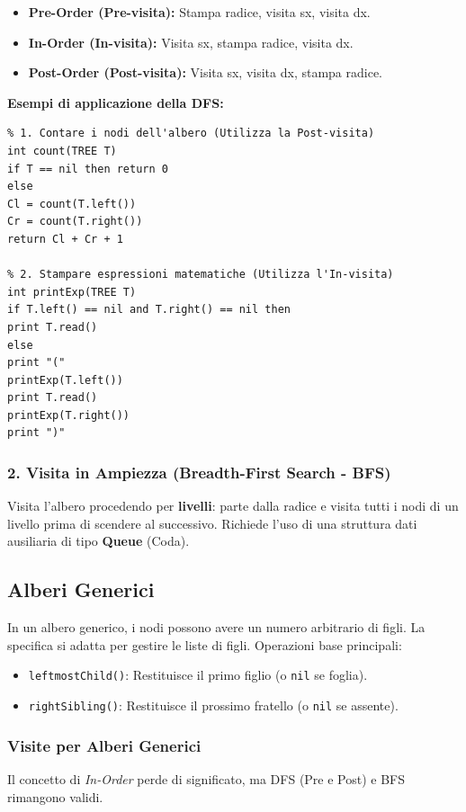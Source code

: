 \documentclass[12pt, a4paper]{article}
\begin{document}
\begin{itemize}
\item \textbf{Pre-Order (Pre-visita):} Stampa radice, visita sx, visita dx.
\item \textbf{In-Order (In-visita):} Visita sx, stampa radice, visita dx.
\item \textbf{Post-Order (Post-visita):} Visita sx, visita dx, stampa radice.
\end{itemize}

\textbf{Esempi di applicazione della DFS:}
\begin{verbatim}
% 1. Contare i nodi dell'albero (Utilizza la Post-visita)
int count(TREE T)
if T == nil then return 0
else
Cl = count(T.left())
Cr = count(T.right())
return Cl + Cr + 1

% 2. Stampare espressioni matematiche (Utilizza l'In-visita)
int printExp(TREE T)
if T.left() == nil and T.right() == nil then
print T.read()
else
print "("
printExp(T.left())
print T.read()
printExp(T.right())
print ")"
\end{verbatim}

\subsubsection{2. Visita in Ampiezza (Breadth-First Search - BFS)}
Visita l'albero procedendo per \textbf{livelli}: parte dalla radice e visita tutti i nodi di un livello prima di scendere al successivo. Richiede l'uso di una struttura dati ausiliaria di tipo \textbf{Queue} (Coda).

\newpage

\subsection{Alberi Generici}
In un albero generico, i nodi possono avere un numero arbitrario di figli. La specifica si adatta per gestire le liste di figli.
Operazioni base principali:
\begin{itemize}
\item \texttt{leftmostChild()}: Restituisce il primo figlio (o \texttt{nil} se foglia).
\item \texttt{rightSibling()}: Restituisce il prossimo fratello (o \texttt{nil} se assente).
\end{itemize}

\subsubsection{Visite per Alberi Generici}
Il concetto di \textit{In-Order} perde di significato, ma DFS (Pre e Post) e BFS rimangono validi.
\end{document}
